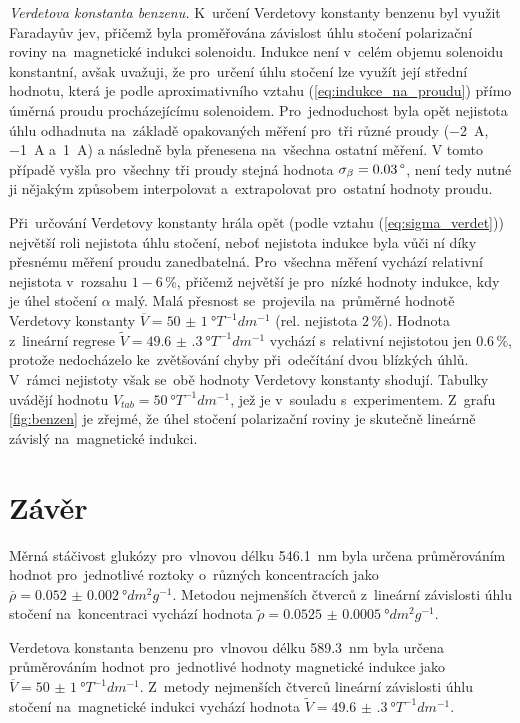 \documentclass{../concepts/titul_protokol_p/prepareprotokol} %
\begin{document}
\textit{Verdetova konstanta benzenu.} K~určení Verdetovy konstanty benzenu byl využit Faradayův jev, přičemž byla proměřována
závislost úhlu stočení polarizační roviny na~magnetické indukci solenoidu. Indukce není v~celém objemu solenoidu konstantní,
avšak uvažuji, že pro~určení úhlu stočení lze využít její střední hodnotu, která je podle aproximativního vztahu 
(\ref{eq:indukce_na_proudu}) přímo úměrná proudu procházejícímu solenoidem. Pro~jednoduchost byla opět nejistota
úhlu odhadnuta na~základě opakovaných měření pro~tři různé proudy (\qty{-2}{A}, \qty{-1}{A} a~\qty{1}{A}) a následně byla přenesena
na~všechna ostatní měření. V tomto případě vyšla pro~všechny tři proudy stejná hodnota $\sigma_\beta = 0.03 \,\degree$,
není tedy nutné ji nějakým způsobem interpolovat a~extrapolovat pro~ostatní hodnoty proudu.

Při~určování Verdetovy konstanty hrála opět (podle vztahu (\ref{eq:sigma_verdet})) největší roli nejistota úhlu stočení,
neboť nejistota indukce byla vůči ní díky přesnému měření proudu zanedbatelná. Pro~všechna měření
vychází relativní nejistota v~rozsahu $1-6\,\%$, přičemž největší je pro~nízké hodnoty indukce,
kdy je úhel stočení $\alpha$ malý. Malá přesnost se~projevila na~průměrné hodnotě Verdetovy konstanty 
$\overline{V} = \qty{50(1)}{\degree T^{-1} dm^{-1}}$ (rel. nejistota $2\,\%$). Hodnota z~lineární regrese
$\tilde{V} = \qty{49.6(3)}{\degree T^{-1} dm^{-1}}$ vychází s~relativní nejistotou jen $0.6\,\%$, protože nedocházelo
ke~zvětšování chyby při~odečítání dvou blízkých úhlů. V~rámci nejistoty však se~obě hodnoty Verdetovy konstanty shodují.
Tabulky \cite{broz} uvádějí hodnotu $V_{tab} = \qty{50}{\degree T^{-1} dm^{-1}}$, jež je v~souladu s~experimentem.
Z~grafu \ref{fig:benzen} je zřejmé, že úhel stočení polarizační roviny je skutečně lineárně závislý na~magnetické indukci.

\section{Závěr}

Měrná stáčivost glukózy pro~vlnovou délku \qty{546.1}{nm} byla určena průměrováním hodnot pro~jednotlivé roztoky
o~různých koncentracích jako $\overline{\rho} = \qty{0.052(2)}{\degree dm^{2} g^{-1}}$. Metodou nejmenších čtverců
z~lineární závislosti úhlu stočení na~koncentraci vychází hodnota
$\tilde{\rho} = \qty{0.0525(5)}{ \degree dm^2 g^{-1} }$.

Verdetova konstanta benzenu pro~vlnovou délku \qty{589.3}{nm} byla určena průměrováním hodnot pro~jednotlivé
hodnoty magnetické indukce jako $\overline{V} = \qty{50(1)}{\degree T^{-1} dm^{-1}}$. Z~metody nejmenších čtverců lineární 
závislosti úhlu stočení na~magnetické indukci vychází hodnota
$\tilde{V} = \qty{49.6(3)}{\degree T^{-1} dm^{-1}}$.
\end{document}
